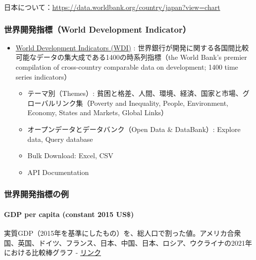 \documentclass[
]{bxjsbook}
\providecommand{\tightlist}{%
  \setlength{\itemsep}{0pt}\setlength{\parskip}{0pt}}
\theoremstyle{definition}
\theoremstyle{definition}
\theoremstyle{definition}
\theoremstyle{definition}
\theoremstyle{remark}
\begin{document}
日本について：\url{https://data.worldbank.org/country/japan?view=chart}

\hypertarget{ux4e16ux754cux958bux767aux6307ux6a19world-development-indicator}{%
\subsubsection{世界開発指標（World Development Indicator）}\label{ux4e16ux754cux958bux767aux6307ux6a19world-development-indicator}}

\begin{itemize}
\tightlist
\item
  \href{https://datatopics.worldbank.org/world-development-indicators/}{World Development Indicators (WDI)} : 世界銀行が開発に関する各国間比較可能なデータの集大成である1400の時系列指標（the World Bank's premier compilation of cross-country comparable data on development; 1400 time series indicators）

  \begin{itemize}
  \tightlist
  \item
    テーマ別（Themes）: 貧困と格差、人間、環境、経済、国家と市場、グローバルリンク集（Poverty and Inequality, People, Environment, Economy, States and Markets, Global Links）
  \item
    オープンデータとデータバンク（Open Data \& DataBank）: Explore data, Query database
  \item
    Bulk Download: Excel, CSV
  \item
    API Documentation
  \end{itemize}
\end{itemize}

\hypertarget{ux4e16ux754cux958bux767aux6307ux6a19ux306eux4f8b}{%
\subsubsection{世界開発指標の例}\label{ux4e16ux754cux958bux767aux6307ux6a19ux306eux4f8b}}

\hypertarget{gdp-per-capita-constant-2015-us}{%
\paragraph{GDP per capita (constant 2015 US\$)}\label{gdp-per-capita-constant-2015-us}}

実質GDP（2015年を基準にしたもの）を、総人口で割った値。アメリカ合衆国、英国、ドイツ、フランス、日本、中国、日本、ロシア、ウクライナの2021年における比較棒グラフ - \href{https://data.worldbank.org/indicator/NY.GDP.PCAP.KD?locations=JP-GB-RU-FR-CN-US-UA-DE\&start=2021\&end=2021\&view=bar}{リンク}
\end{document}
